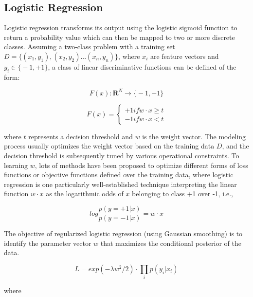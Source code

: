 \documentclass[sigconf]{acmart}
\begin{document}
\subsection{Logistic Regression}
\label{subsection:logistic}

Logistic regression \cite{harrell2001ordinal} transforms its output using the logistic sigmoid function to return a probability value which can then be mapped to two or more discrete classes. Assuming a two-class problem with a training set $D = \big\{ (x_1, y_1), (x_2, y_2)...(x_n, y_n) \big\} $, where $x_i$ are feature vectors and $y_i \in \big\{ -1, +1 \big\}$, a class of linear discriminative functions can be defined of the form:

\begin{equation}
F(x): \mathbf{R}^N \rightarrow \big\{ -1, +1 \big\}
\end{equation}

\begin{equation}
F(x) = \begin{cases}
    +1 if w \cdot x \geq t \\
        -1 if w \cdot x < t 
    \end{cases}
\end{equation}

where $t$ represents a decision threshold and $w$ is the weight vector. The modeling process usually optimizes the weight vector based on the training data $D$, and the decision threshold is subsequently tuned by various operational constraints. To learning $w$, lots of methods have been proposed to optimize different forms of loss functions or objective functions defined over the training data, where logistic regression is one particularly well-established technique interpreting the linear function $w \cdot x$ as the logarithmic odds of $x$ belonging to class +1 over -1, i.e., 

\begin{equation}
log\frac{p(y=+1|x)}{p(y=-1|x)} = w \cdot x
\end{equation}

The objective of regularized logistic regression (using Gaussian smoothing) is to identify the parameter vector $w$ that maximizes the conditional posterior of the data.

\begin{equation}
L = exp(-\lambda w^2 /2) \cdot \prod_i p( y_i | x_i )
\end{equation}

where 
\end{document}
